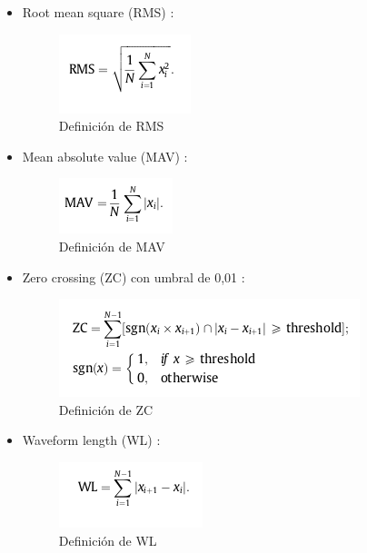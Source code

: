 \begin{itemize}
\item Root mean square (RMS) \cite{phinyomark2012feature}:

    \begin{figure}[ht]
        \centering
        \includegraphics[scale=0.8]{imagenes/formula de caracteristicas/rms.png}
        \caption{ Definición de RMS \cite{phinyomark2012feature}}
        \label{fig:rms1}
    \end{figure}


\item Mean absolute value (MAV) \cite{phinyomark2012feature}:

    \begin{figure}[ht]
        \centering
        \includegraphics[scale=0.8]{imagenes/formula de caracteristicas/mav.png}
        \caption{ Definición de MAV \cite{phinyomark2012feature}}
        \label{fig:mav1}
    \end{figure}
    
 \newpage   
\item Zero crossing (ZC) con umbral de 0,01 \cite{phinyomark2012feature}:
    \begin{figure}[ht]
        \centering
        \includegraphics[scale=0.8]{imagenes/formula de caracteristicas/zc.png}
        \caption{ Definición de ZC \cite{phinyomark2012feature}}
        \label{fig:zc1}
    \end{figure}


\item Waveform length (WL) \cite{phinyomark2012feature}:
    \begin{figure}[ht]
        \centering
        \includegraphics[scale=0.8]{imagenes/formula de caracteristicas/wl.png}
        \caption{ Definición de WL \cite{phinyomark2012feature}}
        \label{fig:wl1}
    \end{figure}


\end{itemize}
